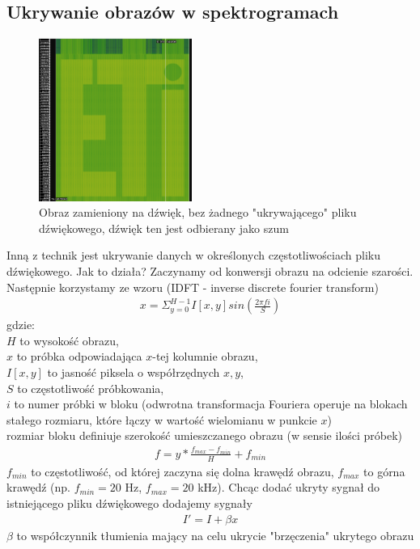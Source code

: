 \documentclass{article}
\begin{document}
\subsection{Ukrywanie obrazów w spektrogramach}
\begin{figure}[H]
	\centering
	\includegraphics[width=5cm]{samobraz}
	\caption{Obraz zamieniony na dźwięk, bez żadnego "ukrywającego" pliku dźwiękowego, dźwięk
	ten jest odbierany jako szum}
\end{figure}
Inną z technik jest ukrywanie danych w określonych częstotliwościach pliku dźwiękowego.
Jak to działa? Zaczynamy od konwersji obrazu na odcienie szarości.
Następnie korzystamy ze wzoru (IDFT - inverse discrete fourier transform)
\begin{gather*}
	x = \Sigma_{y=0}^{H-1}I[x,y]sin(\frac{2\pi f i}{S})
\end{gather*}
gdzie: \\ 
$H$ to wysokość obrazu, \\
$x$ to próbka odpowiadająca $x$-tej kolumnie obrazu,\\
$I[x,y]$ to jasność piksela o współrzędnych $x,y$, \\
$S$ to częstotliwość próbkowania, \\
$i$ to numer próbki w bloku (odwrotna transformacja Fouriera operuje na blokach stałego rozmiaru,
które łączy w wartość wielomianu w punkcie $x$) \\
rozmiar bloku definiuje szerokość umieszczanego obrazu (w sensie ilości próbek) 
\begin{gather*}
 f = y * \frac{f_{max} - f_{min}}{H} + f_{min} 
\end{gather*}
 $f_{min}$ to częstotliwość, od której zaczyna
się dolna krawędź obrazu, $f_{max}$ to górna krawędź (np. $f_{min} = 20$ Hz, $f_{max} = 20$ kHz).
Chcąc dodać ukryty sygnał do istniejącego pliku dźwiękowego dodajemy sygnały
\begin{gather*}
I' = I + \beta x
\end{gather*}
$\beta$ to współczynnik tłumienia mający na celu ukrycie "brzęczenia" ukrytego obrazu
\end{document}
